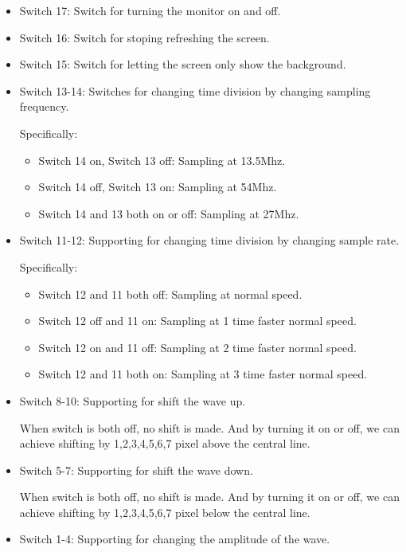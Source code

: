 \documentclass[11pt]{scrartcl}
\begin{document}
\begin{itemize}
    \item Switch 17:
    Switch for turning the monitor on and off.
    \item Switch 16:
    Switch for stoping refreshing the screen.
    \item Switch 15:
    Switch for letting the screen only show the background.
    \item Switch 13-14:
    Switches for changing time division by changing sampling frequency.
    
    Specifically:
    \begin{itemize}
        \item Switch 14 on, Switch 13 off:
        Sampling at 13.5Mhz.
        \item Switch 14 off, Switch 13 on:
        Sampling at 54Mhz.
        \item Switch 14 and 13 both on or off:
        Sampling at 27Mhz.        
    \end{itemize}
    \item Switch 11-12:
    Supporting for changing time division by changing sample rate.
    
    Specifically:
    \begin{itemize}
        \item Switch 12 and 11 both off:
        Sampling at normal speed.
        \item Switch 12 off and 11 on:
        Sampling at 1 time faster normal speed.
        \item Switch 12 on and 11 off:
        Sampling at 2 time faster normal speed.
        \item Switch 12 and 11 both on:
        Sampling at 3 time faster normal speed.
    \end{itemize}
    \item Switch 8-10:
    Supporting for shift the wave up.
    
    When switch is both off, no shift is made. And by turning it on or off, we can achieve shifting by 1,2,3,4,5,6,7 pixel above the central line.
    \item Switch 5-7:
    Supporting for shift the wave down.
    
    When switch is both off, no shift is made. And by turning it on or off, we can achieve shifting by 1,2,3,4,5,6,7 pixel below the central line.
    \item Switch 1-4:
    Supporting for changing the amplitude of the wave.
    

\end{itemize}
\end{document}
